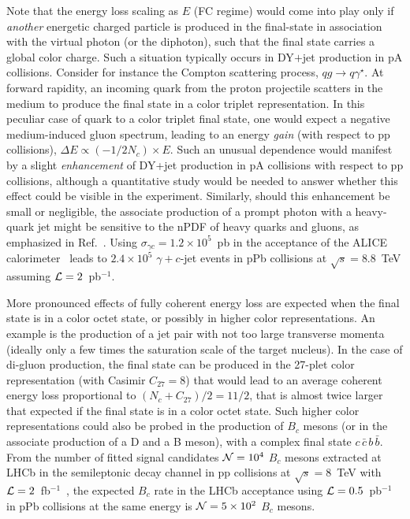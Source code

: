 \documentclass[../report.tex]{subfiles}
\begin{document}
Note that the energy loss scaling as $E$ (FC regime) would come into play only if {\it another} energetic charged particle is produced in the final-state in association with the virtual photon (or the diphoton), such that the final state carries a global color charge. Such a situation typically occurs in DY$+$jet production in pA collisions. Consider for instance the Compton scattering process, $qg \to q\gamma^\star$. At forward rapidity, an incoming quark from the proton projectile scatters in the medium to produce the final state in a color triplet representation. In this peculiar case of quark to a color triplet final state, one would expect a negative medium-induced gluon spectrum, leading to an energy \emph{gain} (with respect to pp collisions), $\Delta E \propto (-1/2N_c)\times E$. Such an unusual dependence would manifest by a slight \emph{enhancement} of DY+jet production in pA collisions with respect to pp collisions, although a quantitative study would be needed to answer whether this effect could be visible in the experiment. Similarly, should this enhancement be small or negligible, the associate production of a prompt photon with a heavy-quark jet might be sensitive to the nPDF of heavy quarks and gluons, as emphasized in Ref.~\cite{Stavreva:2010mw}. Using $\sigma_{\gamma c} = 1.2\times10^5$~pb in the acceptance of the ALICE calorimeter~\cite{Stavreva:2010mw} leads to $2.4\times10^5$ $\gamma+c$-jet events in pPb collisions at $\sqrt{s}=8.8$~TeV assuming ${\cal L}=2$~pb$^{-1}$.

More pronounced effects of fully coherent energy loss are expected when the final state is in a color octet state, or possibly in higher color representations. An example is the production of a jet pair with not too large transverse momenta (ideally only a few times the saturation scale of the target nucleus). In the case of di-gluon production, the final state can be produced in the 27-plet color representation (with Casimir $C_{27}=8$) that would lead to an average coherent energy loss proportional to $(N_c+C_{27})/2=11/2$, that is almost twice larger that expected if the final state is in a color octet state. Such higher color representations could also be probed in the production of $B_c$ mesons (or in the associate production of a D and a B meson), with a complex final state $c\,\bar{c}\,b\,\bar{b}$. From the number of fitted signal candidates ${\cal N}=10^4$ $B_c$ mesons extracted at LHCb in the semileptonic decay channel in pp collisions at $\sqrt{s}=8$~TeV with ${\cal L}=2$~fb$^{-1}$~\cite{Aaij:2014bva}, the expected $B_c$ rate in the LHCb acceptance using ${\cal L}=0.5$~pb$^{-1}$ in pPb collisions at the same energy is ${\cal N}=5\times 10^2$ $B_c$ mesons.
\end{document}
